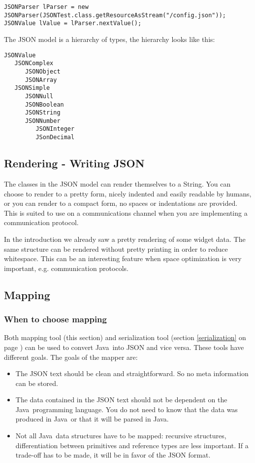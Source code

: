\documentclass[a4paper]{article}
\newcommand{\java}{Java}
\begin{document}
\medskip
\begin{lstlisting}[basicstyle=\ttfamily\scriptsize{}]
JSONParser lParser = new JSONParser(JSONTest.class.getResourceAsStream("/config.json"));
JSONValue lValue = lParser.nextValue();
\end{lstlisting}
\medskip

The JSON model is a hierarchy of types, the hierarchy looks like this:

\medskip
\begin{lstlisting}
JSONValue
   JSONComplex
      JSONObject
      JSONArray
   JSONSimple
      JSONNull
      JSONBoolean
      JSONString
      JSONNumber
         JSONInteger
         JSonDecimal
\end{lstlisting}
\medskip

\subsection{Rendering - Writing JSON}

The classes in the JSON model can render themselves to a String. You can choose to render to a pretty form, nicely indented and easily readable by humans, or you can render to a compact form, no spaces or indentations are provided. This is suited to use on a communications channel when you are implementing a communication protocol.

In the introduction we already saw a pretty rendering of some widget data. The same structure can be rendered without pretty printing in order to reduce whitespace. This can be an interesting feature when space optimization is very important, e.g. communication protocols.

\subsection{Mapping}
\label{mapping}
\subsubsection{When to choose mapping}

Both mapping tool (this section) and serialization tool (section \ref{serialization} on page \pageref{serialization}) can be used to convert \java\ into JSON and vice versa. These tools have different goals. The goals of the mapper are:

\begin{itemize}
	\item The JSON text should be clean and straightforward. So no meta information can be stored.
	\item The data contained in the JSON text should not be dependent on the \java\ programming language. You do not need to know that the data was produced in \java\ or that it will be parsed in \java.
	\item Not all \java\ data structures have to be mapped: recursive structures, differentiation between primitives and reference types are less important. If a trade-off has to be made, it will be in favor of the JSON format.
\end{itemize}
\end{document}
